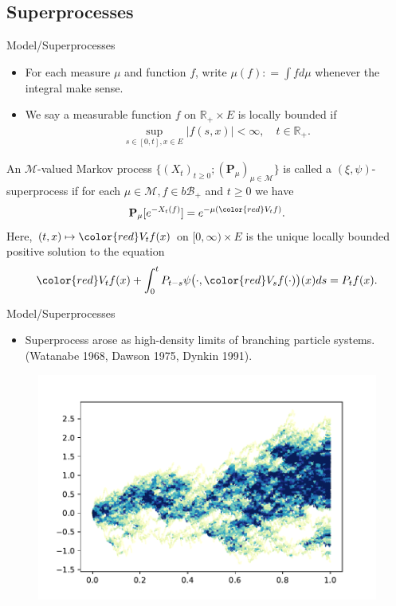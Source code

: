 \documentclass[xcolor=dvipsnames]{beamer}
\begin{document}
\subsection{Superprocesses}
\begin{frame}{Model/Superprocesses}
\begin{itemize}
\item
For each measure $\mu$ and function $f$, write
$\mu(f) : = \int f d\mu$ whenever the integral make sense.
\item
We say a measurable function $f$ on $\mathbb R_+ \times E$ is {\color{blue} locally bounded} if
\begin{align}
\sup_{s\in [0,t], x\in E} |f(s,x)| < \infty, \quad t\in \mathbb R_+.
\end{align}
\end{itemize}
\begin{definition}[Superprocesses]
An $\mathcal M$-valued Markov process {\color{red} $\{(X_t)_{t\geq 0}; (\mathbf P_\mu)_{\mu\in \mathcal M}\}$} is called a $(\xi,\psi)$-superprocess if for each $\mu \in \mathcal M, f\in b\mathscr B_+$ and $t\geq 0$ we have
\[
  \mathbf P_\mu [e^{-X_t(f)}] = e^{-\mu( {\color{red} V_tf} )}.
\]
Here, $(t,x) \mapsto {\color{red} V_tf(x)}$ on $[0,\infty) \times E$ is the unique {\color{blue} locally bounded} positive solution to the equation
\begin{align*}\label{eq:FKPP_in_definition}
  {\color{red} V_tf(x)} + \int_0^{t} P_{t-s} \psi \big(\cdot, {\color{red} V_sf(\cdot)}\big) (x) ds 
  = P_t f(x).
\end{align*}
\end{definition}
\end{frame}
\begin{frame}{Model/Superprocesses}
\begin{itemize}
\item
  Superprocess arose as high-density limits of branching particle systems. (Watanabe 1968, Dawson 1975, Dynkin 1991).
\end{itemize}
\begin{figure}
  \includegraphics[scale= 0.7]{critical_Superprocess.pdf}
\end{figure}
\end{frame}
\end{document}
